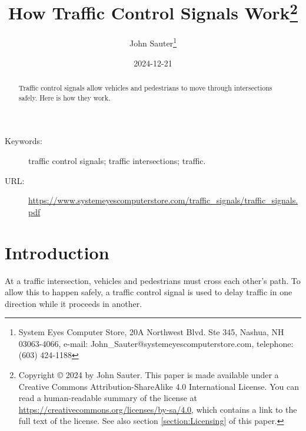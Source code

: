 \documentclass[letterpaper,twoside]{article}
\begin{document}
\title{How Traffic Control Signals Work\footnote{Copyright
    {\copyright} 2024 by John Sauter.
    This paper is made available under a
    Creative Commons Attribution-ShareAlike 4.0 International License.
    You can read a human-readable summary of the license at
    \href{https://creativecommons.org/licenses/by-sa/4.0}{https://creativecommons.org/licenses/by-sa/4.0},
    which contains a link to the full text of the license.
    See also section \ref{section:Licensing} of this paper.}
}
\author{John Sauter\footnote{
    System Eyes Computer Store,
    20A Northwest Blvd.  Ste 345,
    Nashua, NH  03063-4066,
    e-mail: John\_Sauter@systemeyescomputerstore.com,
    telephone: (603) 424-1188}}

\date{2024-12-21}
\maketitle
\begin{abstract}
  Traffic control signals allow vehicles and pedestrians to move through
  intersections safely.  Here is how they work.
\end{abstract}
\begin{description}
\item[Keywords:]traffic control signals; traffic intersections; traffic.
\item[URL:]\href{https://www.systemeyescomputerstore.com/traffic\_signals/traffic\_signalst.pdf}{https://www.systemeyescomputerstore.com/traffic\_signals/traffic\_signals.pdf}
\end{description}
\newpage

\section{Introduction}
At a traffic intersection, vehicles and pedestrians must cross each other's
path.  To allow this to happen safely, a traffic control signal is used to
delay traffic in one direction while it proceeds in another.
\end{document}
